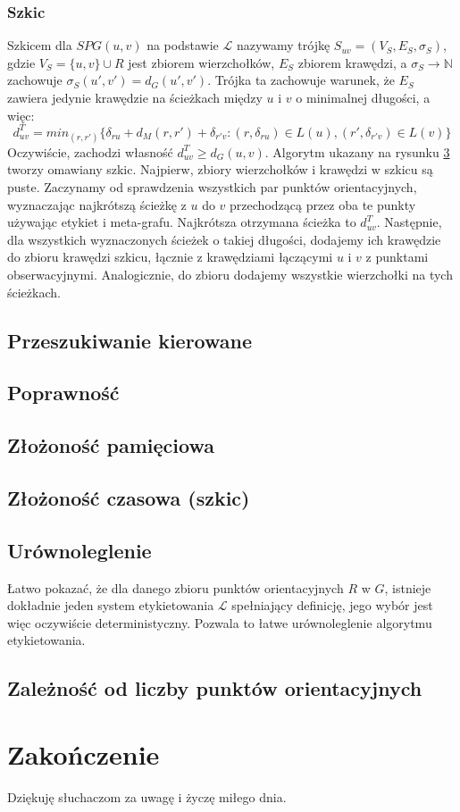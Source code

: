\documentclass{article}
\theoremstyle{definition}
\begin{document}
        \subsubsection*{Szkic}
            Szkicem dla $SPG(u,v)$ na podstawie $\mathcal{L}$ nazywamy trójkę $S_{uv} = (V_S, E_S, \sigma_S)$, gdzie $V_S = \{u,v\} \cup R$ jest zbiorem wierzchołków, $E_S$ zbiorem krawędzi, a $\sigma_S \rightarrow \mathbb{N}$ zachowuje $\sigma_S(u', v') = d_G(u', v')$. Trójka ta zachowuje warunek, że $E_S$ zawiera jedynie krawędzie na ścieżkach między $u$ i $v$ o minimalnej długości, a więc:
            \[
                d_{uv}^T = min_{(r,r')}\{\delta_{ru} + d_M(r,r') + \delta_{r'v} : (r,\delta_{ru}) \in L(u), (r',\delta_{r'v}) \in L(v)\}
            \]
            Oczywiście, zachodzi własność $d_{uv}^T \geq d_G(u,v)$. Algorytm ukazany na rysunku \hyperref[fig:alg3]{3} tworzy omawiany szkic. Najpierw, zbiory wierzchołków i krawędzi w szkicu są puste. Zaczynamy od sprawdzenia wszystkich par punktów orientacyjnych, wyznaczając najkrótszą ścieżkę z $u$ do $v$ przechodzącą przez oba te punkty używając etykiet i meta-grafu. Najkrótsza otrzymana ścieżka to $d_{uv}^T$. Następnie, dla wszystkich wyznaczonych ścieżek o takiej długości, dodajemy ich krawędzie do zbioru krawędzi szkicu, łącznie z krawędziami łączącymi $u$ i $v$ z punktami obserwacyjnymi. Analogicznie, do zbioru dodajemy wszystkie wierzchołki na tych ścieżkach.
    
    \subsection{Przeszukiwanie kierowane}
        
    \subsection{Poprawność}

    \subsection{Złożoność pamięciowa}
    
    \subsection{Złożoność czasowa (szkic)}

    \subsection{Urównoleglenie}
        Łatwo pokazać, że dla danego zbioru punktów orientacyjnych $R$ w $G$, istnieje dokładnie jeden system etykietowania $\mathcal{L}$ spełniający definicję, jego wybór jest więc oczywiście deterministyczny. Pozwala to łatwe urównoleglenie algorytmu etykietowania.

    \subsection{Zależność od liczby punktów orientacyjnych}
    
    \section{Zakończenie}
    Dziękuję słuchaczom za uwagę i życzę miłego dnia. 
    
\end{document}
